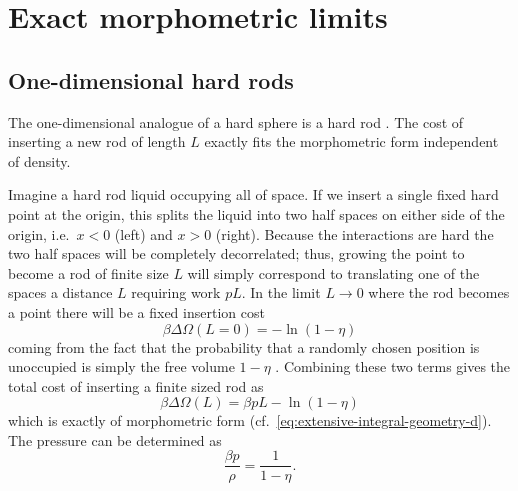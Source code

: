 \documentclass[11pt,twoside]{report}
\begin{document}


\section{Exact morphometric limits}

\subsection{One-dimensional hard rods}
\label{sec:hard-rods}

The one-dimensional analogue of a hard sphere is a hard rod%
.
The cost of inserting a new rod of length $L$ exactly fits the morphometric form independent of density.

Imagine a hard rod liquid occupying all of space.
If we insert a single fixed hard point at the origin, this splits the liquid into two half spaces on either side of the origin, i.e.\ $x < 0$ (left) and $x > 0$ (right).
Because the interactions are hard the two half spaces will be completely decorrelated; thus, growing the point to become a rod of finite size $L$ will simply correspond to translating one of the spaces a distance $L$ requiring work $p L$.
In the limit $L \to 0$ where the rod becomes a point there will be a fixed insertion cost
\begin{equation*}
  \beta \Delta \Omega(L=0) = -\ln{(1-\eta)}
\end{equation*}
coming from the fact that the probability that a randomly chosen position is unoccupied is simply the free volume $1-\eta$ \cite{ReissJCP1959}.
Combining these two terms gives the total cost of inserting a finite sized rod as
\begin{equation}\label{eq:hard-rods-morphometric}
  \beta \Delta \Omega(L) = \beta p L - \ln{(1-\eta)}
\end{equation}
which is exactly of morphometric form (cf.\ \eqref{eq:extensive-integral-geometry-d}).
The pressure can be determined as \cite{TonksPR1936}
\begin{equation}\label{eq:hard-rods-eos}
  \frac{\beta p}{\rho} = \frac{1}{1 - \eta}.
\end{equation}
\end{document}
